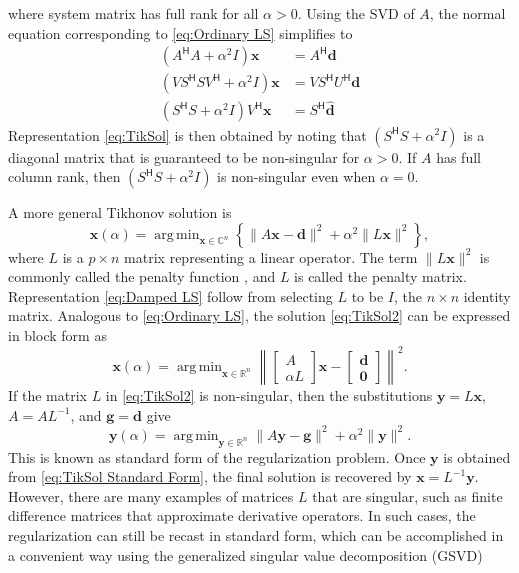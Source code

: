 \documentclass[12pt]{article}
\newcommand{\dVec}{\mathbf{d}}	%
\newcommand{\xVec}{\mathbf{x}}	%
\newcommand{\ctrans}[1]{{#1}^\mathsf{H}}	%
\newcommand{\regparam}{\alpha}
\DeclareMathOperator*{\argmin}{arg\,min}
\newcommand{\svd}[1]{\widehat{#1}}	%
\begin{document}
where system matrix has full rank for all $\regparam > 0$. Using the SVD of $A$, the normal equation corresponding to \eqref{eq:Ordinary LS} simplifies to
\begin{align}
(\ctrans{A}A + \regparam^2 I)\xVec &= \ctrans{A}\dVec \nonumber \\
(V\ctrans{S}S\ctrans{V} + \regparam^2 I)\xVec &= V\ctrans{S}\ctrans{U}\dVec \nonumber \\
(\ctrans{S}S + \regparam^2 I)\ctrans{V}\xVec &= \ctrans{S}\svd{\dVec}
\end{align}
Representation \eqref{eq:TikSol} is then obtained by noting that $(\ctrans{S}S + \regparam^2 I)$ is a diagonal matrix that is guaranteed to be non-singular for $\regparam > 0$. If $A$ has full column rank, then $(\ctrans{S}S + \regparam^2 I)$ is non-singular even when $\regparam = 0$. \par
A more general Tikhonov solution is
\begin{equation}
\label{eq:TikSol2}
\xVec(\regparam) = \argmin_{\xVec \in \mathbb{C}^n} \left\{\|A\xVec - \dVec\|^2 + \regparam^2\|L\xVec\|^2\right\},
\end{equation}
where $L$ is a $p \times n$ matrix representing a linear operator. The term $\|L\xVec\|^2$ is commonly called the penalty function \cite{Vogel:2002}, and $L$ is called the penalty matrix. Representation \eqref{eq:Damped LS} follow from selecting $L$ to be $I$, the $n \times n$ identity matrix. Analogous to \eqref{eq:Ordinary LS}, the solution \eqref{eq:TikSol2} can be expressed in block form as
\begin{equation}
\xVec(\regparam) = \argmin_{\xVec \in \mathbb{R}^n} \left\| \begin{bmatrix}
A \\
\regparam L
\end{bmatrix}\xVec - \begin{bmatrix}
\dVec \\
\bm{0}
\end{bmatrix} \right\|^2.
\label{eq:TikSol3}
\end{equation}
If the matrix $L$ in \eqref{eq:TikSol2} is non-singular, then the substitutions $\mathbf{y} = L\xVec$, $A = A{L}^{-1}$, and $\mathbf{g} = \dVec$ give
\begin{equation}
\mathbf{y}(\regparam) = \argmin_{\mathbf{y} \in \mathbb{R}^n} \|A\mathbf{y} - \mathbf{g}\|^2 + \regparam^2\|\mathbf{y}\|^2.
\label{eq:TikSol Standard Form}
\end{equation}
This is known as standard form of the regularization problem. Once $\mathbf{y}$ is obtained from \eqref{eq:TikSol Standard Form}, the final solution is recovered by $\xVec = L^{-1}\mathbf{y}$.  However, there are many examples of matrices $L$ that are singular, such as finite difference matrices that approximate derivative operators. In such cases, the regularization can still be recast in standard form, which can be accomplished in a convenient way using the generalized singular value decomposition (GSVD) \cite{HansenGSVD,Hansen:98} \par
\end{document}
